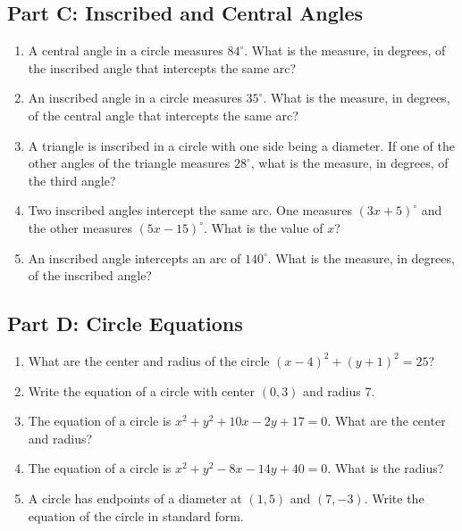 \documentclass[14pt]{extarticle}
\begin{document}
\subsection*{Part C: Inscribed and Central Angles}
\begin{enumerate}
  \item A central angle in a circle measures \(84^\circ\). What is the measure, in degrees, of the inscribed angle that intercepts the same arc?
  \item An inscribed angle in a circle measures \(35^\circ\). What is the measure, in degrees, of the central angle that intercepts the same arc?
  \item A triangle is inscribed in a circle with one side being a diameter. If one of the other angles of the triangle measures \(28^\circ\), what is the measure, in degrees, of the third angle?
  \item Two inscribed angles intercept the same arc. One measures \((3x + 5)^\circ\) and the other measures \((5x - 15)^\circ\). What is the value of \(x\)?
  \item An inscribed angle intercepts an arc of \(140^\circ\). What is the measure, in degrees, of the inscribed angle?
\end{enumerate}

\subsection*{Part D: Circle Equations}
\begin{enumerate}
  \item What are the center and radius of the circle \((x - 4)^2 + (y + 1)^2 = 25\)?
  \item Write the equation of a circle with center \((0, 3)\) and radius 7.
  \item The equation of a circle is \(x^2 + y^2 + 10x - 2y + 17 = 0\). What are the center and radius?
  \item The equation of a circle is \(x^2 + y^2 - 8x - 14y + 40 = 0\). What is the radius?
  \item A circle has endpoints of a diameter at \((1, 5)\) and \((7, -3)\). Write the equation of the circle in standard form.
\end{enumerate}
\end{document}
